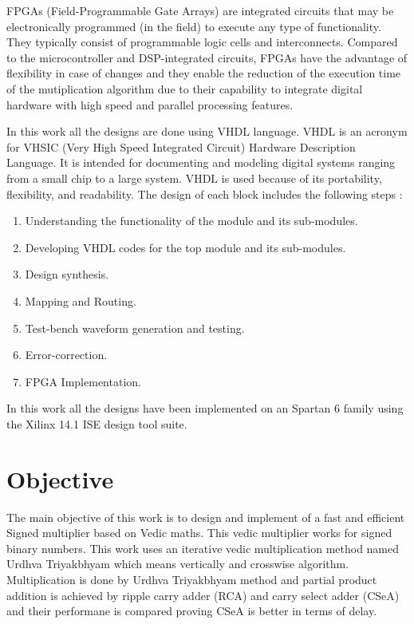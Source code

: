 FPGAs (Field-Programmable Gate Arrays) are integrated circuits that may be electronically programmed (in the field) to execute any type of functionality. They typically consist of programmable logic cells and interconnects. Compared to the microcontroller and DSP-integrated circuits, FPGAs have the advantage of flexibility in case of changes and they enable the reduction of the execution time of the mutiplication algorithm due to their capability to integrate digital hardware with high speed and parallel processing features.

In this work all the designs are done using VHDL language. VHDL is an acronym for VHSIC (Very High Speed Integrated Circuit) Hardware Description Language. It is intended for documenting and modeling digital systems ranging from a small chip to a large system. VHDL is used because of its portability, flexibility, and readability. The design of each block includes the following steps :
\begin{enumerate}
  \item Understanding the functionality of the module and its sub-modules.
  \item Developing VHDL codes for the top module and its sub-modules.
  \item Design synthesis.
  \item Mapping and Routing.
  \item Test-bench waveform generation and testing.
  \item Error-correction.
  \item FPGA Implementation.
\end{enumerate}

 In this work all the designs have been implemented on an Spartan 6 family using the Xilinx 14.1 ISE design tool suite.
\section{Objective}

The main objective of this work is to design and implement of a fast and efficient Signed multiplier based on Vedic maths. This vedic multiplier works for signed binary numbers. This work uses an iterative vedic multiplication method named Urdhva Triyakbhyam which means vertically and crosswise algorithm. Multiplication is done by Urdhva Triyakbhyam method and partial product addition is achieved by ripple carry adder (RCA) and carry select adder (CSeA) and their performane is compared proving CSeA is better in terms of delay.



